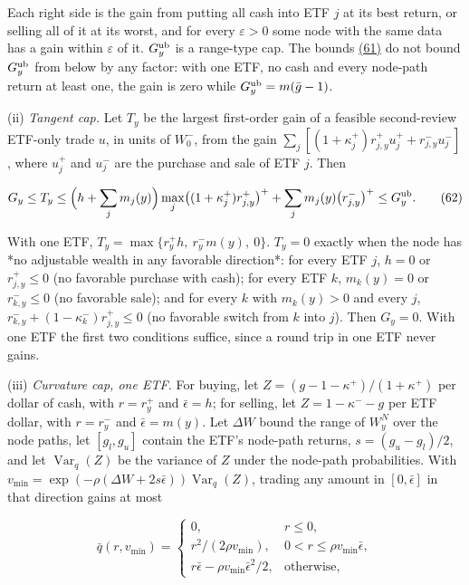 \documentclass[11pt]{article}
\begin{document}
Each right side is the gain from putting all cash into ETF \(j\)
at its best return, or selling all of it at its worst, and for
every \(\varepsilon>0\) some node with the same data has a gain
within \(\varepsilon\) of it. \(G^{\rm ub}_y\) is a range-type
cap. The bounds \hyperref[eq:61]{(61)} do not bound \(G^{\rm ub}_y\) from below
by any factor: with one ETF, no cash and every node-path return
at least one, the gain is zero while \(G^{\rm ub}_y=m(\bar g-1)\).

(ii) \emph{Tangent cap.} Let \(T_y\) be the largest first-order gain
of a feasible second-review ETF-only trade \(u\), in units of
\(W_0^-\), from the gain
\(\sum_j[(1+\kappa^+_j)r^+_{j,y}u_j^++r^-_{j,y}u_j^-]\), where
\(u_j^+\) and \(u_j^-\) are the purchase and sale of ETF \(j\).
Then

\begin{equation*}
G_y\leq T_y\leq
\Bigl(h+\sum_jm_j(y)\Bigr)
  \max_j\bigl((1+\kappa^+_j)r^+_{j,y}\bigr)^+
 +\sum_jm_j(y)\bigl(r^-_{j,y}\bigr)^+
\leq G^{\rm ub}_y.\tag{62}\label{eq:62}
\end{equation*}

With one ETF, \(T_y=\max\{r^+_yh,\ r^-_ym(y),\ 0\}\).
\(T_y=0\) exactly when the node has *no adjustable wealth in
any favorable direction*: for every ETF \(j\), \(h=0\) or
\(r^+_{j,y}\leq0\) (no favorable purchase with cash); for every
ETF \(k\), \(m_k(y)=0\) or \(r^-_{k,y}\leq0\) (no favorable
sale); and for every \(k\) with \(m_k(y)>0\) and every \(j\),
\(r^-_{k,y}+(1-\kappa^-_k)r^+_{j,y}\leq0\) (no favorable switch
from \(k\) into \(j\)). Then \(G_y=0\). With one ETF the first
two conditions suffice, since a round trip in one ETF never
gains.

(iii) \emph{Curvature cap, one ETF.} For buying, let
\(Z=(g-1-\kappa^+)/(1+\kappa^+)\) per dollar of cash, with
\(r=r^+_y\) and \(\bar\epsilon=h\); for selling, let
\(Z=1-\kappa^--g\) per ETF dollar, with \(r=r^-_y\) and
\(\bar\epsilon=m(y)\). Let \(\Delta W\) bound the range of
\(W^N_y\) over the node paths, let \([g_l,g_u]\) contain the
ETF's node-path returns, \(s=(g_u-g_l)/2\), and let
\(\operatorname{Var}_q(Z)\) be the variance of \(Z\) under the
node-path probabilities. With
\(v_{\min}=\exp(-\rho(\Delta W+2s\bar\epsilon))
\operatorname{Var}_q(Z)\), trading any amount in
\([0,\bar\epsilon]\) in that direction gains at most

\begin{equation*}
\bar q(r,v_{\min})=
\begin{cases}
0,& r\leq0,\\
r^2/(2\rho v_{\min}),& 0<r\leq\rho v_{\min}\bar\epsilon,\\
r\bar\epsilon-\rho v_{\min}\bar\epsilon^2/2,& \text{otherwise},
\end{cases}\tag{63}\label{eq:63}
\end{equation*}
\end{document}
